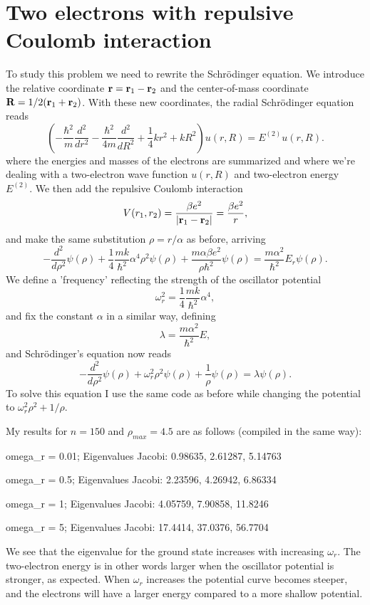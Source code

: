 \documentclass[a4paper,12pt, english]{article}
\begin{document}
\section*{Two electrons with repulsive Coulomb interaction}
To study this problem we need to rewrite the Schr\"odinger equation. We introduce the relative 
coordinate ${\bf r} = {\bf r}_1-{\bf r}_2$
and the center-of-mass coordinate ${\bf R} = 1/2({\bf r}_1+{\bf r}_2)$.
With these new coordinates, the radial Schr\"odinger equation reads
\[
\left(  -\frac{\hbar^2}{m} \frac{d^2}{dr^2} -\frac{\hbar^2}{4 m} \frac{d^2}{dR^2}+ \frac{1}{4} k r^2+  kR^2\right)u(r,R)  = E^{(2)} u(r,R).
\]
where the energies and masses of the electrons are summarized and where we're dealing with a two-electron 
wave function
$u(r,R)$ and two-electron energy $E^{(2)}$. We then add the repulsive Coulomb interaction 
\[
V(r_1,r_2) = \frac{\beta e^2}{|{\bf r}_1-{\bf r}_2|}=\frac{\beta e^2}{r},
\]
and make the same substitution $\rho = r/\alpha$ as before, arriving
\[
  -\frac{d^2}{d\rho^2} \psi(\rho) 
       + \frac{1}{4}\frac{mk}{\hbar^2} \alpha^4\rho^2\psi(\rho)+\frac{m\alpha \beta e^2}{\rho\hbar^2}\psi(\rho)  = 
\frac{m\alpha^2}{\hbar^2}E_r \psi(\rho) .
\]
We define a 'frequency' reflecting the strength of the oscillator potential
\[
\omega_r^2=\frac{1}{4}\frac{mk}{\hbar^2} \alpha^4,
\]
and fix the constant $\alpha$ in a similar way, defining
\[
\lambda = \frac{m\alpha^2}{\hbar^2}E,
\]
and Schr\"odinger's equation now reads 
\[
  -\frac{d^2}{d\rho^2} \psi(\rho) + \omega_r^2\rho^2\psi(\rho) +\frac{1}{\rho}\psi(\rho) = \lambda \psi(\rho).
\]
To solve this equation I use the same code as before while changing the potential to $\omega_r^2\rho^2+1/\rho$.

My results for $n = 150$ and $\rho_{max} = 4.5$ are as follows (compiled in the same way):

omega_r = 0.01; Eigenvalues Jacobi: 0.98635, 2.61287, 5.14763

omega_r = 0.5; Eigenvalues Jacobi: 2.23596, 4.26942, 6.86334

omega_r = 1; Eigenvalues Jacobi: 4.05759, 7.90858, 11.8246

omega_r = 5; Eigenvalues Jacobi: 17.4414, 37.0376, 56.7704

We see that the eigenvalue for the ground state increases with increasing $\omega_r$. The two-electron energy is 
in other words larger when the oscillator potential is stronger, as expected. When $\omega_r$ increases 
the potential curve becomes steeper, and the electrons will have a larger energy compared to a more 
shallow potential. 
\end{document}
